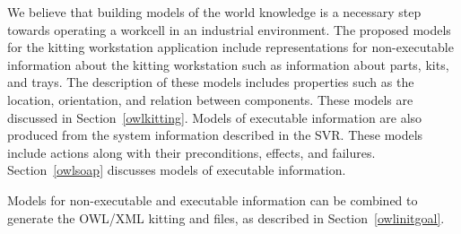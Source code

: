 We believe that building models of the world knowledge is a necessary step towards 
operating a workcell in an industrial environment. The proposed models 
for the kitting workstation application include 
representations for non-executable information about the kitting workstation 
such as information about parts, kits, and trays. The description of these 
models includes properties such as the location, orientation, and relation 
between components. These models are discussed in Section~\ref{owlkitting}. 
Models of executable information are also produced from the system 
information described in the SVR. These models include actions along 
with their preconditions, effects, and failures. 
Section~\ref{owlsoap} discusses models of executable information.

Models for non-executable and executable information can be 
combined to generate the OWL/XML kitting  and  
files, as described in Section~\ref{owlinitgoal}.

